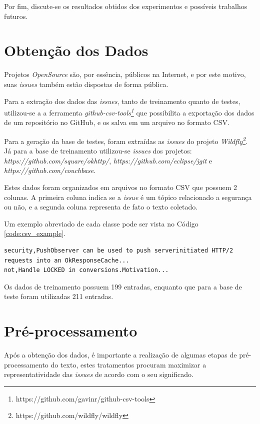 \documentclass[conference]{IEEEtran}
\begin{document}
Por fim, discute-se os resultados obtidos dos experimentos e possíveis trabalhos futuros.

\section{Obtenção dos Dados}

Projetos \textit{OpenSource} são, por essência, públicos na Internet, e por este motivo, suas \textit{issues} também estão dispostas de forma pública.

Para a extração dos dados das \textit{issues}, tanto de treinamento quanto de testes, utilizou-se a a ferramenta \textit{github-csv-tools\footnote{https://github.com/gavinr/github-csv-tools}} que possibilita a exportação dos dados de um repositório no GitHub, e os salva em um arquivo no formato CSV.

Para a geração da base de testes, foram extraídas as \textit{issues} do projeto \textit{Wildfly\footnote{https://github.com/wildfly/wildfly}}. Já para a base de treinamento utilizou-se \textit{issues} dos projetos: \textit{https://github.com/square/okhttp/}, \textit{https://github.com/eclipse/jgit} e \textit{https://github.com/couchbase}.

Estes dados foram organizados em arquivos no formato CSV que possuem 2 colunas. A primeira coluna indica se a \textit{issue} é um tópico relacionado a segurança ou não, e a segunda coluna representa de fato o texto coletado.

Um exemplo abreviado de cada classe pode ser vista no Código \ref{code:csv_example}.

\begin{lstlisting}[caption={CSV Exemplo com Base de Dados},captionpos=b,frame=single,label={code:csv_example}]
security,PushObserver can be used to push serverinitiated HTTP/2 requests into an OkResponseCache...
not,Handle LOCKED in conversions.Motivation...
\end{lstlisting}

Os dados de treinamento possuem 199 entradas, enquanto que para a base de teste foram utilizadas 211 entradas.

\section{Pré-processamento}

Após a obtenção dos dados, é importante a realização de algumas etapas de pré-processamento do texto, estes tratamentos procuram maximizar a representatividade das \textit{issues} de acordo com o seu significado.
\end{document}
